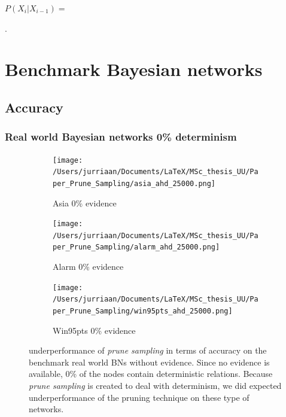 \documentclass[a4paper, twoside, 11pt]{report}
\theoremstyle{plain}
\theoremstyle{definition}
\theoremstyle{remark}
\newcommand{\ps}{\textit{prune sampling }}
\begin{document}
\vspace{2pc}
$P(X_i |X_{i-1})=$
\begin{table}[h!]
\centering
{}.
\caption{a block shaped CPT}
\label{block}
\end{table}

\section{Benchmark Bayesian networks}
\subsection{Accuracy}
\subsubsection{Real world Bayesian networks 0\% determinism}\label{real_world_no_evidence}

\begin{figure}[H]
\centering
\begin{subfigure}{0.5\textwidth}
\texttt{[image: /Users/jurriaan/Documents/LaTeX/MSc\_thesis\_UU/Paper\_Prune\_Sampling/asia\_ahd\_25000.png]}
\caption{Asia 0\% evidence}%
\label{asia}%
\end{subfigure}\hfill%
\begin{subfigure}{0.5\textwidth}
\texttt{[image: /Users/jurriaan/Documents/LaTeX/MSc\_thesis\_UU/Paper\_Prune\_Sampling/alarm\_ahd\_25000.png]}
\caption{Alarm 0\% evidence}%
\label{alarm}%
\end{subfigure}%
\begin{subfigure}{0.5\textwidth}
\texttt{[image: /Users/jurriaan/Documents/LaTeX/MSc\_thesis\_UU/Paper\_Prune\_Sampling/win95pts\_ahd\_25000.png]}
\caption{Win95pts 0\% evidence}%
\label{win95pts}%
\end{subfigure}\hfill%
\vspace{0.75pc}
\caption{underperformance of \ps in terms of accuracy on the benchmark real world BNs without evidence. Since no evidence is available, 0\% of the nodes contain deterministic relations. Because \ps is created to deal with determinism, we did expected underperformance of the pruning technique on these type of networks.  }
\label{results2}
\end{figure}
\end{document}

